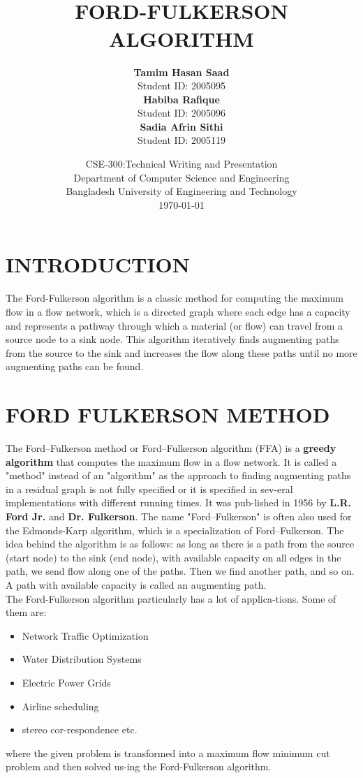 \documentclass{article}
\title{
    \hrulefill \\
    \vspace{0.5cm}
    \textbf{FORD-FULKERSON ALGORITHM} \\
    \vspace{0.5cm}
    \hrulefill
    \vspace*{1cm}
}
\author{
\textbf{Tamim Hasan Saad} \\Student ID: 2005095\\ \textbf{Habiba Rafique} \\Student ID: 2005096 \\ 
\textbf{Sadia Afrin Sithi} \\Student ID: 2005119
\vspace*{1cm}
}
\date{
CSE-300:Technical Writing and Presentation\\
Department of Computer Science and Engineering\\
Bangladesh University of Engineering and Technology\\
\vspace*{1cm}
\today
}
\begin{document}
\maketitle
\pagebreak
\tableofcontents
\pagebreak
\listoffigures
\pagebreak
\listoftables


\clearpage
{} %

\section{\textbf{INTRODUCTION}}
{\fontsize{15}{15}\selectfont
The Ford-Fulkerson algorithm is a classic method for computing the maximum flow in a flow network, which is a directed graph where each edge has a capacity and represents a pathway through which a material (or flow) can travel from a source node to a sink node. This algorithm iteratively finds augmenting paths from the source to the sink and increases the flow along these paths until no more augmenting paths can be found.
}

\vspace{0.7cm}

\section{\textbf{FORD FULKERSON METHOD}}
{\fontsize{15}{15}\selectfont
The Ford–Fulkerson method or Ford–Fulkerson algorithm (FFA) is a \textbf{greedy algorithm} that computes the maximum flow in a flow network. It is called a "method" instead of an "algorithm" as the approach to finding augmenting paths in a residual graph is not fully specified or it is specified in sev-eral implementations with different running times. It was pub-lished in 1956 by \textbf{L.R. Ford Jr.} and \textbf{Dr. Fulkerson}. The name "Ford–Fulkerson" is often also used for the Edmonds-Karp algorithm, which is a specialization of Ford–Fulkerson. The idea behind the algorithm is as follows: as long as there is a path from the source (start node) to the sink (end node), with available capacity on all edges in the path, we send flow along one of the paths. Then we find another path, and so on. A path with available capacity is called an augmenting path. \\

\vspace{0.3cm}
The Ford-Fulkerson algorithm particularly has a lot of applica-tions. Some of them are:
\begin{itemize}
    \item Network Traffic Optimization
    \item Water Distribution Systems
    \item Electric Power Grids
    \item Airline scheduling
    \item stereo cor-respondence etc.
\end{itemize}
\vspace{0.3cm}
where the given problem is transformed into a maximum flow minimum cut problem and then solved us-ing the Ford-Fulkerson algorithm.
}
\cite{cormen2001section}
\pagebreak
\end{document}
